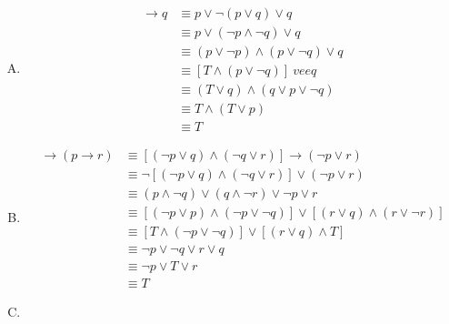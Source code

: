 {{        %
        \begin{practices}
            \begin{enumerate}[A.]
                \item
                {
                    \begin{align*}
                        [\neg p \wedge (p \vee q)] \rightarrow q
                        &\equiv p \vee \neg (p \vee q) \vee q \\
                        &\equiv p \vee (\neg p \wedge \neg q) \vee q \\
                        &\equiv (p \vee \neg p) \wedge (p \vee \neg q) \vee q \\
                        &\equiv [T \wedge (p \vee \neg q)] \ vee q \\
                        &\equiv (T \vee q) \wedge (q \vee p \vee \neg q) \\
                        &\equiv T \wedge (T \vee p) \\
                        &\equiv T
                    \end{align*}
                }
                \item
                {
                    \begin{align*}
                        [(p \rightarrow q) \wedge (q \rightarrow r)] \rightarrow (p \rightarrow r)
                        &\equiv [(\neg p \vee q) \wedge (\neg q \vee r)] \rightarrow (\neg p \vee r) \\
                        &\equiv \neg [(\neg p \vee q) \wedge (\neg q \vee r)] \vee (\neg p \vee r) \\
                        &\equiv (p \wedge \neg q) \vee (q \wedge \neg r) \vee \neg p \vee r \\
                        &\equiv [(\neg p \vee p) \wedge (\neg p \vee \neg q)] \vee [(r \vee q) \wedge (r \vee \neg r)] \\
                        &\equiv [T \wedge (\neg p \vee \neg q)] \vee [(r \vee q) \wedge T] \\
                        &\equiv \neg p \vee \neg q \vee r \vee q \\
                        &\equiv \neg p \vee T \vee r \\
                        &\equiv T
                    \end{align*}
                }
                \item
                {
                    \begin{align*}

\end{align*}}
\end{enumerate}
\end{practices}}}

